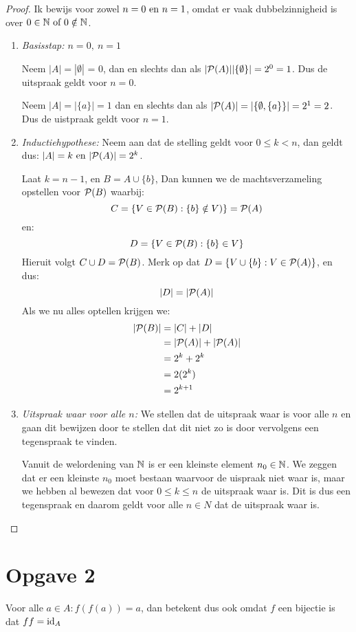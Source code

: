 \documentclass{article}
\begin{document}
\begin{proof}
	Ik bewijs voor zowel $n = 0 \text{ en } n = 1$,
	omdat er vaak dubbelzinnigheid is over
	$0 \in \mathbb{N} \text{ of } 0 \notin \mathbb{N}$.
	\begin{enumerate}
		\item \emph{Basisstap: $n = 0, \ n = 1$}

		      Neem $|A| = |\emptyset|$ = 0,
		      dan en slechts dan als
		      $|\mathcal{P}(A)| |\{\emptyset\}| = 2^0 = 1$.
		      Dus de uitspraak geldt voor $n = 0$.


		      Neem $|A| = |\{a\}| = 1$
		      dan en slechts dan als
		      $|\mathcal{P}(A)| = |\{\emptyset, \{a\}\}| = 2^1 = 2$.
		      Dus de uistpraak geldt voor $n = 1$.
		\item \emph{Inductiehypothese:}
		      Neem aan dat de stelling geldt voor
		      $0 \leq k < n$, dan geldt dus:
		      $|A| = k \text{ en } |\mathcal{P}(A)| = 2^k$.

		      Laat $k = n-1$, en $B = A \cup \{b\}$,
		      Dan kunnen we de machtsverzameling opstellen
		      voor $\mathcal{P}(B)$ waarbij:
		      \[C = \{V \in \mathcal{P}(B): \{b\} \notin V)\} = \mathcal{P}(A) \]
		      en:
		      \[ D = \{V \in \mathcal{P}(B): \{b\} \in V \} \]
		      Hieruit volgt $C \cup D = \mathcal{P}(B)$. Merk op
		      dat $D = \{V \cup \{b\} : V \in \mathcal{P}(A)\}$, en dus:
		      \[|D| = |\mathcal{P}(A)|\]
		      Als we nu alles optellen krijgen we:
		      \begin{align*}
			      |\mathcal{P}(B)| & = |C| + |D|             \\
			                & = |\mathcal{P}(A)| + |\mathcal{P}(A)| \\
			                & = 2^k + 2^k             \\
			                & = 2(2^k)                \\
			                & = 2^{k+1}               \\
		      \end{align*}
		\item \emph{Uitspraak waar voor alle $n$:}
		      We stellen dat de uitspraak waar is voor alle
		      $n$ en gaan dit bewijzen door te stellen dat
		      dit niet zo is door vervolgens een tegenspraak
		      te vinden.

		      Vanuit de welordening van $\mathbb{N}$ is er een kleinste
		      element $n_0 \in \mathbb{N}$.
		      We zeggen dat er een kleinste $n_0$ moet bestaan
		      waarvoor de uispraak niet waar is, maar
		      we hebben al bewezen dat voor $0 \leq k \leq n$
		      de uitspraak waar is. Dit is dus een tegenspraak
		      en daarom geldt voor alle $n \in N$ dat de uitspraak waar is.
	\end{enumerate}
\end{proof}
\section*{Opgave 2}
Voor alle $a \in A : f(f(a)) = a$,
dan betekent dus ook omdat $f$ een bijectie is
dat $ff = \text{id}_A$
\end{document}
